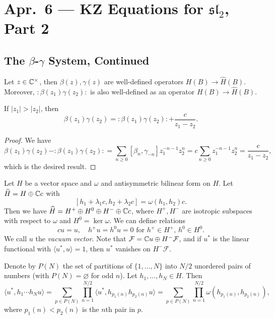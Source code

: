\chapter{Apr.~6 --- KZ Equations for \texorpdfstring{$\mathfrak{sl}_2$}{sl2}, Part 2}

\section{The \texorpdfstring{$\beta$-$\gamma$}{beta-gamma} System, Continued}

\begin{remark}
  Let $z \in \mathbb{C}^\times$, then
  $\beta(z), \gamma(z)$ are well-defined
  operators $H(B) \to \widehat{H}(B)$.
  Moreover,
  ${:} \beta(z_1) \gamma(z_2) {:}$
  is also well-defined as an operator
  $H(B) \to \widehat{H}(B)$.
\end{remark}

\begin{prop}
  If $|z_1| > |z_2|$, then
  \[
    \beta(z_1) \gamma(z_2)
    = {:} \beta(z_1) \gamma(z_2) {:}
     + \frac{c}{z_1 - z_2}.
  \]
\end{prop}

\begin{proof}
  We have
  \[
    \beta(z_1) \gamma(z_2)
    - {:} \beta(z_1) \gamma(z_2) {:}
    = \sum_{n \ge 0} [\beta_n, \gamma_{-n}]
    z_1^{-n - 1} z_2^n
    = c \sum_{n \ge 0}  z_1^{-n - 1} z_2^n
    = \frac{c}{z_1 - z_2},
  \]
  which is the desired result.
\end{proof}

\begin{remark}
  Let $H$ be a vector space and
  $\omega$ and antisymmetric bilinear
  form on $H$. Let
  $\widehat{H} = H \oplus \mathbb{C} c$ with
  \[
    [h_1 + \lambda_1 c, h_2 + \lambda_2 c]
    = \omega(h_1, h_2) c.
  \]
  Then we have
  $\widehat{H} = H^+ \oplus H^0 \oplus H^- \oplus \mathbb{C} c$,
  where $H^+, H^-$ are isotropic subspaces
  with respect to $\omega$ and
  $H^0 = \ker \omega$. We can define
  relations
  \[
    cu = u, \quad
    h^+ u = h^0 u = 0 \text{ for }
    h^+ \in H^+,\, h^0 \in H^0.
  \]
  We call $u$ the \emph{vacuum vector}.
  Note that $\mathcal{F} = \mathbb{C} u \oplus H^- \mathcal{F}$,
  and if $u^*$ is the linear functional
  with $\langle u^*, u \rangle = 1$, then
  $u^*$ vanishes on $H^- \mathcal{F}$.
\end{remark}

\begin{theorem}[Wick]
  Denote by $P(N)$ the set of partitions
  of $\{1, \dots, N\}$ into $N / 2$ unordered
  pairs of numbers (with $P(N) = \varnothing$ for
  odd $n$).
  Let $h_1, \dots, h_N \in H$. Then
  \[
    \langle u^*, h_1 \cdots h_N u \rangle
    = \sum_{p \in P(N)}
    \prod_{n = 1}^{N / 2}
    \langle u^*, h_{p_1(n)} h_{p_2(n)} u \rangle
    = \sum_{p \in P(N)}
    \prod_{n = 1}^{N / 2}
    \omega(h_{p_1(n)}, h_{p_2(n)}),
  \]
  where $p_1(n) < p_2(n)$ is the
  $n$th pair in $p$.
\end{theorem}

